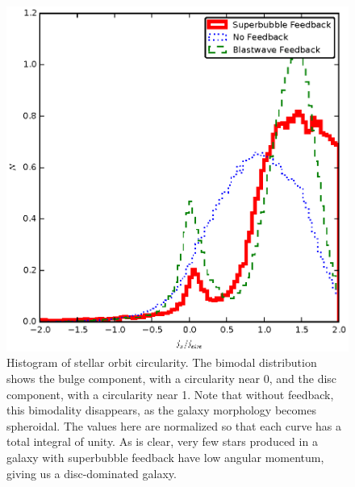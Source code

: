 \begin{figure}
    \includegraphics[width=\columnwidth]{figures2/circularity.eps}
    \caption[Stellar orbit circularity histogram]{Histogram
    of stellar orbit circularity.  The bimodal distribution shows the bulge
    component, with a circularity near 0, and the disc component, with a
    circularity near 1.  Note that without feedback, this bimodality disappears,
    as the galaxy morphology becomes spheroidal.  The values here are normalized
    so that each curve has a total integral of unity.  As is clear, very few
    stars produced in a galaxy with superbubble feedback have low angular
    momentum, giving us a disc-dominated galaxy.}
    \label{circularity}
\end{figure}
